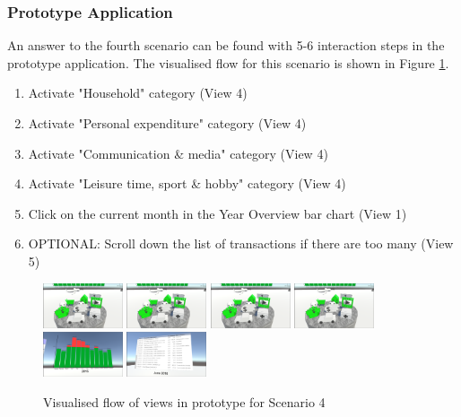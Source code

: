 
\subsubsection{Prototype Application}

An answer to the fourth scenario can be found with 5-6 interaction steps in the prototype application. The visualised flow for this scenario is shown in Figure \ref{fig:scenariofourprototype}.
\begin{enumerate}
	\item Activate "Household" category (View 4)
	\item Activate "Personal expenditure" category (View 4)
	\item Activate "Communication \& media" category (View 4)
	\item Activate "Leisure time, sport \& hobby" category (View 4)
	\item Click on the current month in the Year Overview bar chart (View 1)
	\item OPTIONAL: Scroll down the list of transactions if there are too many (View 5)
\end{enumerate}
\begin{figure}[h]
	\begin{center}
		\includegraphics[width=2.35cm]{03_Figures/08_Development/View4_CategoriesFiltering.png}
		\includegraphics[width=2.35cm]{03_Figures/08_Development/View4_CategoriesFiltering.png}
		\includegraphics[width=2.35cm]{03_Figures/08_Development/View4_CategoriesFiltering.png}
		\includegraphics[width=2.35cm]{03_Figures/08_Development/View4_CategoriesFiltering.png}
		\includegraphics[width=2.35cm]{03_Figures/08_Development/View1_YearOverview.png}
		\includegraphics[width=2.35cm]{03_Figures/08_Development/View5_FinTransactionsOverview.png}
		\caption{Visualised flow of views in prototype for Scenario 4}
		\label{fig:scenariofourprototype}
	\end{center}
\end{figure}

